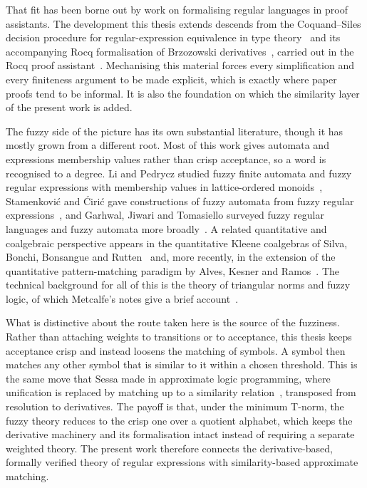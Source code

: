 That fit has been borne out by work on formalising regular languages in proof
assistants. The development this thesis extends descends from the Coquand--Siles
decision procedure for regular-expression equivalence in type
theory~\cite{CoquandRegexEquality} and its accompanying Rocq
formalisation of Brzozowski derivatives~\cite{RocqRegexpBrzozowski}, carried out in
the Rocq proof assistant~\cite{Rocq}. Mechanising this material forces every
simplification and every finiteness argument to be made explicit, which is exactly
where paper proofs tend to be informal. It is also the foundation on which the
similarity layer of the present work is added.

The fuzzy side of the picture has its own substantial literature, though it has
mostly grown from a different root. Most of this work gives automata and
expressions membership values rather than crisp acceptance, so a word is
recognised to a degree. Li and Pedrycz studied fuzzy finite automata and fuzzy
regular expressions with membership values in lattice-ordered
monoids~\cite{LP05}, Stamenkovi\'c and \'Ciri\'c gave constructions of fuzzy automata
from fuzzy regular expressions~\cite{SC12}, and Garhwal, Jiwari and Tomasiello
surveyed fuzzy regular languages and fuzzy automata more broadly~\cite{GJT17}. A
related quantitative and coalgebraic perspective appears in the quantitative Kleene
coalgebras of Silva, Bonchi, Bonsangue and Rutten~\cite{SilvaBonchiBonsangueRutten2011}
and, more recently, in the extension of the quantitative pattern-matching paradigm by
Alves, Kesner and Ramos~\cite{AlvesKesnerRamos2025}. The technical background for all
of this is the theory of triangular norms and fuzzy logic, of which Metcalfe's notes
give a brief account~\cite{met05}.

What is distinctive about the route taken here is the source of the fuzziness. Rather
than attaching weights to transitions or to acceptance, this thesis keeps acceptance
crisp and instead loosens the matching of symbols. A symbol then matches any other
symbol that is similar to it within a chosen threshold. This is the same move that
Sessa made in approximate logic programming, where unification is replaced by
matching up to a similarity relation~\cite{Sessa2002}, transposed from resolution to
derivatives. The payoff is that, under the minimum T-norm, the fuzzy theory reduces
to the crisp one over a quotient alphabet, which keeps the derivative machinery and
its formalisation intact instead of requiring a separate weighted theory. The
present work therefore connects the derivative-based, formally verified theory of
regular expressions with similarity-based approximate matching.
